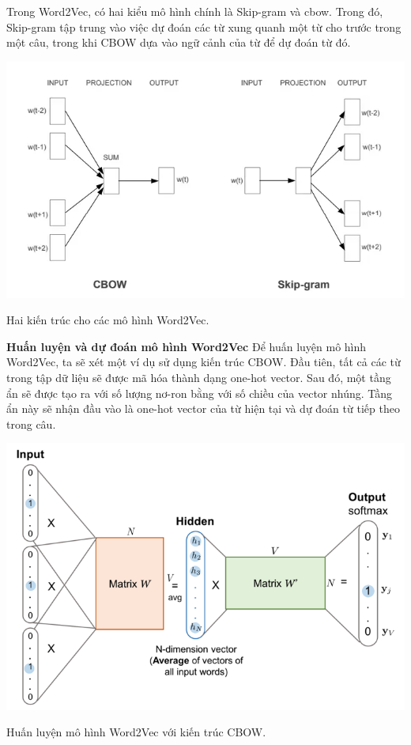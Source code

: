 \documentclass[a4paper, 12pt, openany]{book}
\begin{document}
Trong Word2Vec, có hai kiểu mô hình chính là Skip-gram và \ac{cbow}. Trong đó, Skip-gram tập trung vào việc dự đoán các từ xung quanh một từ cho trước trong một câu, trong khi CBOW dựa vào ngữ cảnh của từ để dự đoán từ đó.

\begin{minipage}{\linewidth}
    \captionsetup{type=figure}
    \centering
    \includegraphics[width=\linewidth]{./assets/images/word2vec.png}
    \caption{Hai kiến trúc cho các mô hình Word2Vec.}
\end{minipage}
\vspace{0.5cm}

\textbf{Huấn luyện và dự đoán mô hình Word2Vec}
Để huấn luyện mô hình Word2Vec, ta sẽ xét một ví dụ sử dụng kiến trúc CBOW.
Đầu tiên, tất cả các từ trong tập dữ liệu sẽ được mã hóa thành dạng one-hot vector. Sau đó, một tầng ẩn sẽ được tạo ra với số lượng nơ-ron bằng với số chiều của vector nhúng. Tầng ẩn này sẽ nhận đầu vào là one-hot vector của từ hiện tại và dự đoán từ tiếp theo trong câu.

\begin{minipage}{\linewidth}
    \captionsetup{type=figure}
    \centering
    \includegraphics[width=\linewidth]{./assets/images/cbow.png}
    \caption{Huấn luyện mô hình Word2Vec với kiến trúc CBOW.}
\end{minipage}
\vspace{0.5cm}
\end{document}
